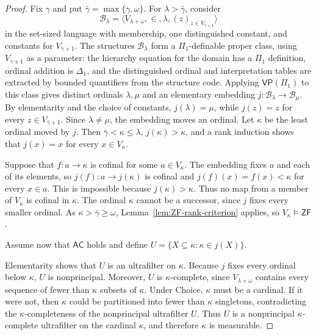 \documentclass[11pt,a4paper]{amsart}
\newcommand{\VP}{\mathsf{VP}}
\newcommand{\AC}{\mathsf{AC}}
\newcommand{\ZF}{\mathsf{ZF}}
\theoremstyle{plain}
\theoremstyle{definition}
\theoremstyle{remark}
\begin{document}
\begin{proof}

Fix $\gamma$ and put $\bar\gamma=\max\{\gamma,\omega\}$.  For $\lambda>\bar\gamma$, consider
\[
\mathcal B_\lambda=\bigl\langle V_{\lambda+\omega},\in,\lambda,
(z)_{z\in V_{\bar\gamma+1}}\bigr\rangle
\]
{\color{auditgreen}
 in the set-sized language with membership, one distinguished constant, and constants for $V_{\bar\gamma+1}$.  The structures $\mathcal B_\lambda$ form a $\Pi_1$-definable proper class, using $V_{\bar\gamma+1}$ as a parameter: the hierarchy equation for the domain has a $\Pi_1$ definition, ordinal addition is $\Delta_1$, and the distinguished ordinal and interpretation tables are extracted by bounded quantifiers from the structure code.  Applying $\VP(\Pi_1)$ to this class gives distinct ordinals $\lambda,\mu$ and an elementary embedding $j:\mathcal B_\lambda\longrightarrow\mathcal B_\mu$.
}
By elementarity and the choice of constants, $j(\lambda)=\mu$, while $j(z)=z$ for every $z\in V_{\bar\gamma+1}$.  Since $\lambda\ne\mu$, the embedding moves an ordinal.  Let $\kappa$ be the least ordinal moved by $j$.  Then $\bar\gamma<\kappa\leq\lambda$, $j(\kappa)>\kappa$, and a rank induction shows that $j(x)=x$ for every $x\in V_\kappa$.

 Suppose that $f:a\to\kappa$ is cofinal for some $a\in V_\kappa$.  The embedding fixes $a$ and each of its elements, so $j(f):a\to j(\kappa)$ is cofinal and $j(f)(x)=f(x)<\kappa$ for every $x\in a$.  This is impossible because $j(\kappa)>\kappa$.  Thus no map from a member of $V_\kappa$ is cofinal in $\kappa$.  The ordinal $\kappa$ cannot be a successor, since $j$ fixes every smaller ordinal.  As $\kappa>\bar\gamma\geq\omega$, Lemma~\ref{lem:ZF-rank-criterion} applies, so $V_\kappa\models\ZF$.

Assume now that $\AC$ holds and define $U=\{X\subseteq\kappa:\kappa\in j(X)\}$.

Elementarity shows that $U$ is an ultrafilter on $\kappa$.  Because $j$ fixes every ordinal below $\kappa$, $U$ is nonprincipal.  Moreover, $U$ is $\kappa$-complete, since $V_{\lambda+\omega}$ contains every sequence of fewer than $\kappa$ subsets of $\kappa$.  Under Choice, $\kappa$ must be a cardinal.  If it were not, then $\kappa$ could be partitioned into fewer than $\kappa$ singletons, contradicting the $\kappa$-completeness of the nonprincipal ultrafilter $U$.  Thus $U$ is a nonprincipal $\kappa$-complete ultrafilter on the cardinal $\kappa$, and therefore $\kappa$ is measurable.
\end{proof}
\end{document}
